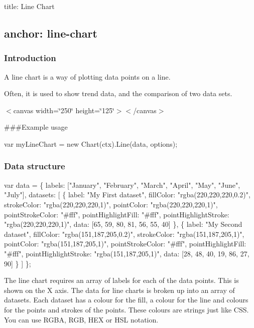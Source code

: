 

 title\+: Line Chart \subsection*{anchor\+: line-\/chart }

\subsubsection*{Introduction}

A line chart is a way of plotting data points on a line.

Often, it is used to show trend data, and the comparison of two data sets.

 $<$canvas width=\char`\"{}250\char`\"{} height=\char`\"{}125\char`\"{}$>$$<$/canvas$>$ 

\#\#\#\+Example usage 
\begin{DoxyCode}
var myLineChart = new Chart(ctx).Line(data, options);
\end{DoxyCode}
 \subsubsection*{Data structure}


\begin{DoxyCode}
var data = \{
    labels: ["January", "February", "March", "April", "May", "June", "July"],
    datasets: [
        \{
            label: "My First dataset",
            fillColor: "rgba(220,220,220,0.2)",
            strokeColor: "rgba(220,220,220,1)",
            pointColor: "rgba(220,220,220,1)",
            pointStrokeColor: "#fff",
            pointHighlightFill: "#fff",
            pointHighlightStroke: "rgba(220,220,220,1)",
            data: [65, 59, 80, 81, 56, 55, 40]
        \},
        \{
            label: "My Second dataset",
            fillColor: "rgba(151,187,205,0.2)",
            strokeColor: "rgba(151,187,205,1)",
            pointColor: "rgba(151,187,205,1)",
            pointStrokeColor: "#fff",
            pointHighlightFill: "#fff",
            pointHighlightStroke: "rgba(151,187,205,1)",
            data: [28, 48, 40, 19, 86, 27, 90]
        \}
    ]
\};
\end{DoxyCode}


The line chart requires an array of labels for each of the data points. This is shown on the X axis. The data for line charts is broken up into an array of datasets. Each dataset has a colour for the fill, a colour for the line and colours for the points and strokes of the points. These colours are strings just like C\+SS. You can use R\+G\+BA, R\+GB, H\+EX or H\+SL notation.

